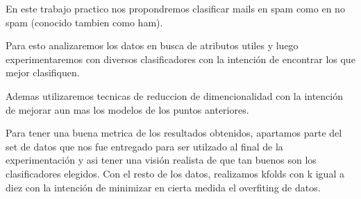 En este trabajo practico nos propondremos clasificar mails en spam como en no spam (conocido tambien como ham).

Para esto analizaremos los datos en busca de atributos utiles y luego experimentaremos con diversos clasificadores con la intención de encontrar los que mejor clasifiquen.

Ademas utilizaremos tecnicas de reduccion de dimencionalidad con la intención de mejorar aun mas los modelos de los puntos anteriores.

Para tener una buena metrica de los resultados obtenidos, apartamos parte del set de datos que nos fue entregado para ser utilzado al final de la experimentación y asi tener una visión realista de que tan buenos son los clasificadores elegidos. Con el resto de los datos, realizamos kfolds con k igual a diez con la intención de minimizar en cierta medida el overfiting de datos.